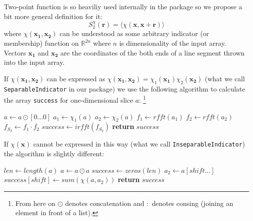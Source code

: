 \documentclass[reprint,amsmath,amssymb,aps,pre,showkeys,showpacs,nofootinbib]{revtex4-1}
\newcommand{\code}[1]{\colorbox{light-gray}{\texttt{#1}}}
\begin{document}
Two-point function is so heaviliy used internally in the package so we propose a
bit more general definition for it:
\begin{equation}
  S_2^{\chi}(\bm{r}) = \langle \chi(\bm{x}, \bm{x} + \bm{r}) \rangle
  \label{eq:s2gen}
\end{equation}
where $\chi(\bm{x_1}, \bm{x_2})$ can be understood as some arbitrary indicator
(or membership) function on $\mathbb{R}^{2n}$ where $n$ is dimensionality of the
input array. Vectors $\bm{x_1}$ and $\bm{x_2}$ are the coordinates of the both
ends of a line segment thrown into the input array.

If $\chi(\bm{x_1}, \bm{x_2})$ can be expressed as
$\chi(\bm{x_1}, \bm{x_2}) = \chi_1(\bm{x_1})\chi_2(\bm{x_2})$ (what we call
\code{SeparableIndicator} in our package) we use the following algorithm to
calculate the array \code{success} for one-dimensional slice $a$: \footnote{From
here on $\odot$ denotes concatenation and $:$ denotes consing (joining an
element in front of a list).}
\begin{algorithmic}[1]
    \State $a \gets a \odot [0 \dots 0]$ 
  \EndIf
  \State $a_1 \gets \chi_1(a)$ 
  \State $a_2 \gets \chi_2(a)$ 
  \State $f_1 \gets rfft(a_1)$ 
  \State $f_2 \gets rfft(a_2)$
  \State $f_{S_2} \gets f_1 \cdot \overline{f_2}$ 
  \State $success \gets irfft(f_{S_2})$ 
  \State \textbf{return} $success$
  \EndProcedure
\end{algorithmic}

If $\chi(\bm{x})$ cannot be expressed in this way (what we call
\code{InseparableIndicator}) the algorithm is slightly different:
\begin{algorithmic}[1]
    \State $len \gets length(a)$
      \State $a \gets a \odot a$
    \EndIf
    \State $success \gets zeros(len)$
      \State $a_2 \gets a[shift \dots]$
      \State $success[shift] \gets sum(\chi(a, a_2))$
    \EndFor
    \State \textbf{return} $success$
  \EndProcedure
\end{algorithmic}
\end{document}
